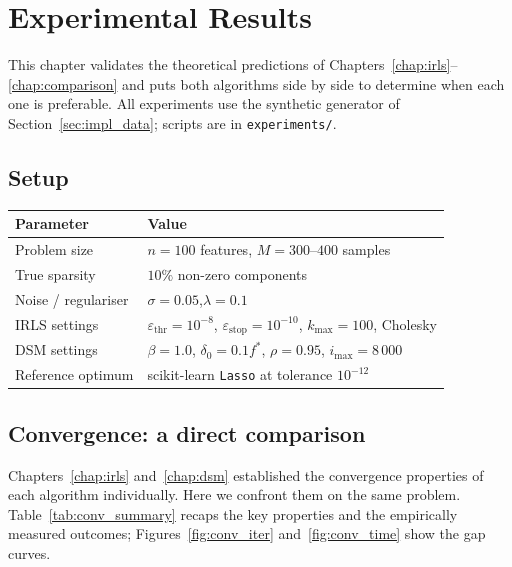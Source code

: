 \chapter{Experimental Results}
\label{chap:results}

This chapter validates the theoretical predictions of
Chapters~\ref{chap:irls}--\ref{chap:comparison} and puts both algorithms
side by side to determine when each one is preferable.
All experiments use the synthetic generator of Section~\ref{sec:impl_data};
scripts are in \texttt{experiments/}.

\section{Setup}
\label{sec:results_setup}

\begin{center}
\begin{tabular}{ll}
\toprule
\textbf{Parameter} & \textbf{Value} \\
\midrule
Problem size         & $n = 100$ features, $M = 300$--$400$ samples \\
True sparsity        & $10\%$ non-zero components \\
Noise / regulariser  & $\sigma = 0.05$,\quad $\lambda = 0.1$ \\
IRLS settings        & $\varepsilon_{\mathrm{thr}}=10^{-8}$, $\varepsilon_{\mathrm{stop}}=10^{-10}$,
                       $k_{\max}=100$, Cholesky \\
DSM settings         & $\beta=1.0$, $\delta_0=0.1f^*$, $\rho=0.95$, $i_{\max}=8\,000$ \\
Reference optimum    & scikit-learn \texttt{Lasso} at tolerance $10^{-12}$ \\
\bottomrule
\end{tabular}
\end{center}

\section{Convergence: a direct comparison}
\label{sec:results_convergence}

Chapters~\ref{chap:irls} and~\ref{chap:dsm} established the convergence
properties of each algorithm individually.
Here we confront them on the same problem.
Table~\ref{tab:conv_summary} recaps the key properties and the
empirically measured outcomes; Figures~\ref{fig:conv_iter}
and~\ref{fig:conv_time} show the gap curves.

